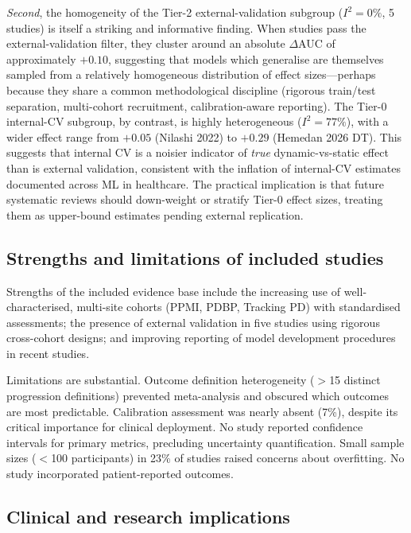 \noindent \emph{Second}, the homogeneity of the Tier-2 external-validation subgroup ($I^2 = 0\%$, 5 studies) is itself a striking and informative finding. When studies pass the external-validation filter, they cluster around an absolute $\Delta$AUC of approximately $+0.10$, suggesting that models which generalise are themselves sampled from a relatively homogeneous distribution of effect sizes---perhaps because they share a common methodological discipline (rigorous train/test separation, multi-cohort recruitment, calibration-aware reporting). The Tier-0 internal-CV subgroup, by contrast, is highly heterogeneous ($I^2 = 77\%$), with a wider effect range from $+0.05$ (Nilashi 2022) to $+0.29$ (Hemedan 2026 DT). This suggests that internal CV is a noisier indicator of \emph{true} dynamic-vs-static effect than is external validation, consistent with the inflation of internal-CV estimates documented across ML in healthcare\cite{collins2024}. The practical implication is that future systematic reviews should down-weight or stratify Tier-0 effect sizes, treating them as upper-bound estimates pending external replication.

\subsection{Strengths and limitations of included studies}
\label{sr:sec:discussion:strengths}

Strengths of the included evidence base include the increasing use of well-characterised, multi-site cohorts (PPMI, PDBP, Tracking PD) with standardised assessments; the presence of external validation in five studies using rigorous cross-cohort designs; and improving reporting of model development procedures in recent studies.

Limitations are substantial. Outcome definition heterogeneity ($>$15 distinct progression definitions) prevented meta-analysis and obscured which outcomes are most predictable. Calibration assessment was nearly absent (7\%), despite its critical importance for clinical deployment. No study reported confidence intervals for primary metrics, precluding uncertainty quantification. Small sample sizes ($<$100 participants) in 23\% of studies raised concerns about overfitting. No study incorporated patient-reported outcomes.

\subsection{Clinical and research implications}
\label{sr:sec:discussion:implications}

